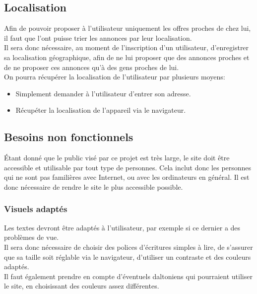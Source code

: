 \documentclass[a4paper,11pt]{article}
\begin{document}
\subsection{Localisation}

Afin de pouvoir proposer à l'utilisateur uniquement les offres proches de chez lui, il faut que l'ont
puisse trier les annonces par leur localisation.\\

Il sera donc nécessaire, au moment de l'inscription d'un utilisateur, d'enregistrer sa localisation
géographique, afin de ne lui proposer que des annonces proches et de ne proposer ces annonces qu'à des
gens proches de lui.\\

On pourra récupérer la localisation de l'utilisateur par plusieurs moyens:\\
\begin{itemize}
  \item Simplement demander à l'utilisateur d'entrer son adresse.
  \item Récupéter la localisation de l'appareil via le navigateur.
\end{itemize}


\subsection{Besoins non fonctionnels}

Étant donné que le public visé par ce projet est très large, le site doit être accessible et utilisable par
tout type de personnes. Cela inclut donc les personnes qui ne sont pas familières avec Internet, ou
avec les ordinateurs en général. Il est donc nécessaire de rendre le site le plus accessible possible.\\

\subsubsection{Visuels adaptés}

Les textes devront être adaptés à l’utilisateur, par exemple si ce dernier a des problèmes de vue.\\

Il sera donc nécessaire de choisir des polices d’écritures simples à lire, de s’assurer que sa taille soit
réglable via le navigateur, d’utiliser un contraste et des couleurs adaptés.\\

Il faut également prendre en compte d’éventuels daltoniens qui pourraient utiliser le site, en
choisissant des couleurs assez différentes.\\
\end{document}
